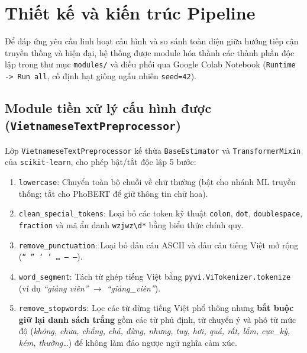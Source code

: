 \documentclass[12pt,a4paper]{article}
\begin{document}
\section{Thiết kế và kiến trúc Pipeline}

Để đáp ứng yêu cầu linh hoạt cấu hình và so sánh toàn diện giữa hướng tiếp cận truyền thống và hiện đại, hệ thống được module hóa thành các thành phần độc lập trong thư mục \texttt{modules/} và điều phối qua Google Colab Notebook (\texttt{Runtime -> Run all}, cố định hạt giống ngẫu nhiên \texttt{seed=42}).

\subsection{Module tiền xử lý cấu hình được (\texttt{VietnameseTextPreprocessor})}
Lớp \texttt{VietnameseTextPreprocessor} kế thừa \texttt{BaseEstimator} và \texttt{TransformerMixin} của \texttt{scikit-learn}, cho phép bật/tắt độc lập 5 bước:
\begin{enumerate}
    \item \texttt{lowercase}: Chuyển toàn bộ chuỗi về chữ thường (bật cho nhánh ML truyền thống; tắt cho PhoBERT để giữ thông tin chữ hoa).
    \item \texttt{clean\_special\_tokens}: Loại bỏ các token kỹ thuật \texttt{colon}, \texttt{dot}, \texttt{doublespace}, \texttt{fraction} và mã ẩn danh \texttt{wzjwz\textbackslash d*} bằng biểu thức chính quy.
    \item \texttt{remove\_punctuation}: Loại bỏ dấu câu ASCII và dấu câu tiếng Việt mở rộng (\texttt{“ ” ‘ ’ … – —}).
    \item \texttt{word\_segment}: Tách từ ghép tiếng Việt bằng \texttt{pyvi.ViTokenizer.tokenize} (ví dụ \textit{``giảng viên''} $\rightarrow$ \textit{``giảng\_viên''}).
    \item \texttt{remove\_stopwords}: Lọc các từ dừng tiếng Việt phổ thông nhưng \textbf{bắt buộc giữ lại danh sách trắng} gồm các từ phủ định, từ chuyển ý và phó từ mức độ (\textit{không, chưa, chẳng, chả, đừng, nhưng, tuy, hơi, quá, rất, lắm, cực\_kỳ, kém, thường\dots}) để không làm đảo ngược ngữ nghĩa cảm xúc.
\end{enumerate}
\end{document}
